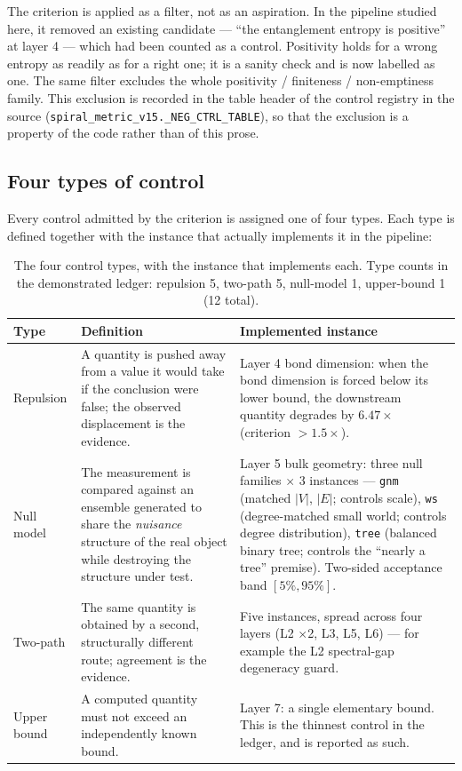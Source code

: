 \documentclass[11pt,a4paper]{article}
\newcommand{\code}[1]{\texttt{\small #1}}
\begin{document}
The criterion is applied as a filter, not as an aspiration. In the pipeline studied
here, it removed an existing candidate --- ``the entanglement entropy is positive''
at layer 4 --- which had been counted as a control. Positivity holds for a wrong
entropy as readily as for a right one; it is a sanity check and is now labelled as
one. The same filter excludes the whole positivity / finiteness / non-emptiness
family. This exclusion is recorded in the table header of the control registry in
the source (\code{spiral\_metric\_v15.\_NEG\_CTRL\_TABLE}), so that the exclusion
is a property of the code rather than of this prose.

\subsection{Four types of control}
\label{sec:taxonomy}

Every control admitted by the criterion is assigned one of four types. Each type is
defined together with the instance that actually implements it in the pipeline:

\begin{table}[h]
\centering\small
\begin{tabular}{@{}p{2.1cm}p{5.6cm}p{7.2cm}@{}}
\toprule
\textbf{Type} & \textbf{Definition} & \textbf{Implemented instance} \\
\midrule
Repulsion &
A quantity is pushed away from a value it would take if the conclusion were false;
the observed displacement is the evidence. &
Layer 4 bond dimension: when the bond dimension is forced below its lower bound,
the downstream quantity degrades by $6.47\times$ (criterion $>1.5\times$). \\[3pt]
Null model &
The measurement is compared against an ensemble generated to share the
\emph{nuisance} structure of the real object while destroying the structure under
test. &
Layer 5 bulk geometry: three null families $\times$ 3 instances --- \code{gnm}
(matched $|V|$, $|E|$; controls scale), \code{ws} (degree-matched small world;
controls degree distribution), \code{tree} (balanced binary tree; controls the
``nearly a tree'' premise). Two-sided acceptance band $[5\%,95\%]$. \\[3pt]
Two-path &
The same quantity is obtained by a second, structurally different route; agreement
is the evidence. &
Five instances, spread across four layers (L2 $\times$2, L3, L5, L6) --- for example
the L2 spectral-gap degeneracy guard. \\[3pt]
Upper bound &
A computed quantity must not exceed an independently known bound. &
Layer 7: a single elementary bound. This is the thinnest control in the ledger, and
is reported as such. \\
\bottomrule
\end{tabular}
\caption{The four control types, with the instance that implements each. Type
counts in the demonstrated ledger: repulsion 5, two-path 5, null-model 1,
upper-bound 1 (12 total).}
\label{tab:types}
\end{table}
\end{document}
